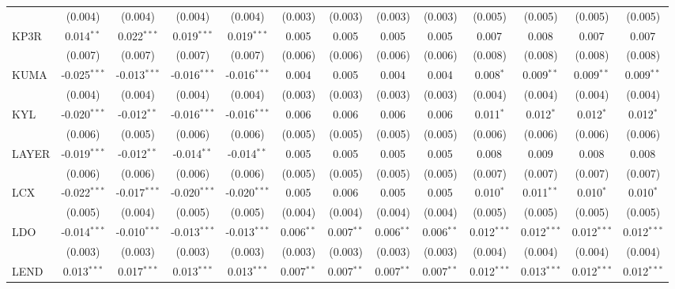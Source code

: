 \begin{table}[!htbp]
\begin{tabular}{@{\extracolsep{5pt}}lcccccccccccc}
  & (0.004) & (0.004) & (0.004) & (0.004) & (0.003) & (0.003) & (0.003) & (0.003) & (0.005) & (0.005) & (0.005) & (0.005) \\
 KP3R & 0.014$^{**}$ & 0.022$^{***}$ & 0.019$^{***}$ & 0.019$^{***}$ & 0.005$^{}$ & 0.005$^{}$ & 0.005$^{}$ & 0.005$^{}$ & 0.007$^{}$ & 0.008$^{}$ & 0.007$^{}$ & 0.007$^{}$ \\
  & (0.007) & (0.007) & (0.007) & (0.007) & (0.006) & (0.006) & (0.006) & (0.006) & (0.008) & (0.008) & (0.008) & (0.008) \\
 KUMA & -0.025$^{***}$ & -0.013$^{***}$ & -0.016$^{***}$ & -0.016$^{***}$ & 0.004$^{}$ & 0.005$^{}$ & 0.004$^{}$ & 0.004$^{}$ & 0.008$^{*}$ & 0.009$^{**}$ & 0.009$^{**}$ & 0.009$^{**}$ \\
  & (0.004) & (0.004) & (0.004) & (0.004) & (0.003) & (0.003) & (0.003) & (0.003) & (0.004) & (0.004) & (0.004) & (0.004) \\
 KYL & -0.020$^{***}$ & -0.012$^{**}$ & -0.016$^{***}$ & -0.016$^{***}$ & 0.006$^{}$ & 0.006$^{}$ & 0.006$^{}$ & 0.006$^{}$ & 0.011$^{*}$ & 0.012$^{*}$ & 0.012$^{*}$ & 0.012$^{*}$ \\
  & (0.006) & (0.005) & (0.006) & (0.006) & (0.005) & (0.005) & (0.005) & (0.005) & (0.006) & (0.006) & (0.006) & (0.006) \\
 LAYER & -0.019$^{***}$ & -0.012$^{**}$ & -0.014$^{**}$ & -0.014$^{**}$ & 0.005$^{}$ & 0.005$^{}$ & 0.005$^{}$ & 0.005$^{}$ & 0.008$^{}$ & 0.009$^{}$ & 0.008$^{}$ & 0.008$^{}$ \\
  & (0.006) & (0.006) & (0.006) & (0.006) & (0.005) & (0.005) & (0.005) & (0.005) & (0.007) & (0.007) & (0.007) & (0.007) \\
 LCX & -0.022$^{***}$ & -0.017$^{***}$ & -0.020$^{***}$ & -0.020$^{***}$ & 0.005$^{}$ & 0.006$^{}$ & 0.005$^{}$ & 0.005$^{}$ & 0.010$^{*}$ & 0.011$^{**}$ & 0.010$^{*}$ & 0.010$^{*}$ \\
  & (0.005) & (0.004) & (0.005) & (0.005) & (0.004) & (0.004) & (0.004) & (0.004) & (0.005) & (0.005) & (0.005) & (0.005) \\
 LDO & -0.014$^{***}$ & -0.010$^{***}$ & -0.013$^{***}$ & -0.013$^{***}$ & 0.006$^{**}$ & 0.007$^{**}$ & 0.006$^{**}$ & 0.006$^{**}$ & 0.012$^{***}$ & 0.012$^{***}$ & 0.012$^{***}$ & 0.012$^{***}$ \\
  & (0.003) & (0.003) & (0.003) & (0.003) & (0.003) & (0.003) & (0.003) & (0.003) & (0.004) & (0.004) & (0.004) & (0.004) \\
 LEND & 0.013$^{***}$ & 0.017$^{***}$ & 0.013$^{***}$ & 0.013$^{***}$ & 0.007$^{**}$ & 0.007$^{**}$ & 0.007$^{**}$ & 0.007$^{**}$ & 0.012$^{***}$ & 0.013$^{***}$ & 0.012$^{***}$ & 0.012$^{***}$ \\

\end{tabular}
\end{table}
